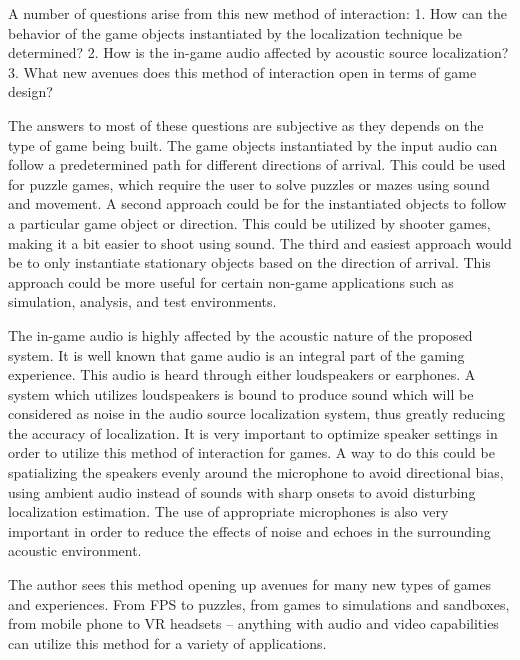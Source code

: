 \documentclass[convention]{aesconf}
\begin{document}
A number of questions arise from this new method of interaction: 
1. How can the behavior of the game objects instantiated by the localization technique be determined? 
2. How is the in-game audio affected by acoustic source localization? 
3. What new avenues does this method of interaction open in terms of game design? 

The answers to most of these questions are subjective as they depends on the type of game being built. The game objects instantiated by the input audio can follow a predetermined path for different directions of arrival. This could be used for puzzle games, which require the user to solve puzzles or mazes using sound and movement. A second approach could be for the instantiated objects to follow a particular game object or direction. This could be utilized by shooter games, making it a bit easier to shoot using sound. The third and easiest approach would be to only instantiate stationary objects based on the direction of arrival. This approach could be more useful for certain non-game applications such as simulation, analysis, and test environments. 

The in-game audio is highly affected by the acoustic nature of the proposed system. It is well known that game audio is an integral part of the gaming experience. This audio is heard through either loudspeakers or earphones. A system which utilizes loudspeakers is bound to produce sound which will be considered as noise in the audio source localization system, thus greatly reducing the accuracy of localization. It is very important to optimize speaker settings in order to utilize this method of interaction for games. A way to do this could be spatializing the speakers evenly around the microphone to avoid directional bias, using ambient audio instead of sounds with sharp onsets to avoid disturbing localization estimation. The use of appropriate microphones is also very important in order to reduce the effects of noise and echoes in the surrounding acoustic environment. 

The author sees this method opening up avenues for many new types of games and experiences. From FPS to puzzles, from games to simulations and sandboxes, from mobile phone to VR headsets -- anything with audio and video capabilities can utilize this method for a variety of applications.
\end{document}
